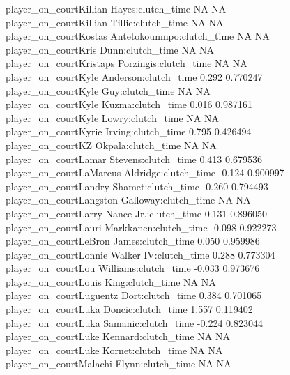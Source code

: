 \documentclass[
  landscape]{article}
\begin{document}
{player\_on\_courtKillian Hayes:clutch\_time NA NA\\
player\_on\_courtKillian Tillie:clutch\_time NA NA\\
player\_on\_courtKostas Antetokounmpo:clutch\_time NA NA\\
player\_on\_courtKris Dunn:clutch\_time NA NA\\
player\_on\_courtKristaps Porzingis:clutch\_time NA NA\\
player\_on\_courtKyle Anderson:clutch\_time 0.292 0.770247\\
player\_on\_courtKyle Guy:clutch\_time NA NA\\
player\_on\_courtKyle Kuzma:clutch\_time 0.016 0.987161\\
player\_on\_courtKyle Lowry:clutch\_time NA NA\\
player\_on\_courtKyrie Irving:clutch\_time 0.795 0.426494\\
player\_on\_courtKZ Okpala:clutch\_time NA NA\\
player\_on\_courtLamar Stevens:clutch\_time 0.413 0.679536\\
player\_on\_courtLaMarcus Aldridge:clutch\_time -0.124 0.900997\\
player\_on\_courtLandry Shamet:clutch\_time -0.260 0.794493\\
player\_on\_courtLangston Galloway:clutch\_time NA NA\\
player\_on\_courtLarry Nance Jr.:clutch\_time 0.131 0.896050\\
player\_on\_courtLauri Markkanen:clutch\_time -0.098 0.922273\\
player\_on\_courtLeBron James:clutch\_time 0.050 0.959986\\
player\_on\_courtLonnie Walker IV:clutch\_time 0.288 0.773304\\
player\_on\_courtLou Williams:clutch\_time -0.033 0.973676\\
player\_on\_courtLouis King:clutch\_time NA NA\\
player\_on\_courtLuguentz Dort:clutch\_time 0.384 0.701065\\
player\_on\_courtLuka Doncic:clutch\_time 1.557 0.119402\\
player\_on\_courtLuka Samanic:clutch\_time -0.224 0.823044\\
player\_on\_courtLuke Kennard:clutch\_time NA NA\\
player\_on\_courtLuke Kornet:clutch\_time NA NA\\
player\_on\_courtMalachi Flynn:clutch\_time NA NA\\
}
\end{document}
